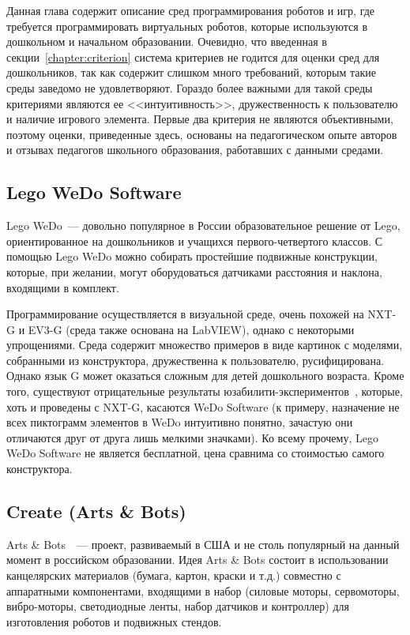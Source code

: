\documentclass[a5paper]{article}
\begin{document}
Данная глава содержит описание сред программирования роботов и игр, где требуется программировать виртуальных роботов, 
которые используются в дошкольном и начальном образовании. Очевидно, что введенная в секции~\ref{chapter:criterion} 
система критериев 
не годится для оценки сред для дошкольников, так как содержит слишком много требований, которым такие среды 
заведомо не удовлетворяют. Гораздо более важными для такой среды критериями являются ее <<интуитивность>>, 
дружественность к пользователю и наличие игрового элемента. Первые два критерия не являются объективными, поэтому оценки, 
приведенные здесь, основаны на педагогическом опыте авторов и отзывах педагогов школьного образования, 
работавших с данными средами.

\subsection{Lego WeDo Software}

Lego WeDo~--- довольно популярное в России образовательное решение от Lego, ориентированное на дошкольников и 
учащихся первого-четвертого классов. С помощью Lego WeDo можно собирать простейшие подвижные конструкции, 
которые, при желании, могут оборудоваться датчиками расстояния и наклона, входящими в комплект.

Программирование осуществляется в визуальной среде, очень похожей на NXT-G и EV3-G (среда также основана 
на LabVIEW), однако с некоторыми упрощениями. Среда содержит множество примеров в виде картинок с моделями, 
собранными из конструктора, дружественна к пользователю, русифицирована. Однако язык G может оказаться 
сложным для детей дошкольного возраста. Кроме того, существуют отрицательные результаты 
юзабилити-экспериментов~\cite{nguyen2011case}, 
которые, хоть и проведены с NXT-G, касаются WeDo Software (к примеру, назначение не всех пиктограмм элементов 
в WeDo интуитивно понятно, зачастую они отличаются друг от друга лишь мелкими значками). Ко всему прочему, 
Lego WeDo Software не является бесплатной, цена сравнима со стоимостью самого конструктора.

\subsection{Create (Arts \& Bots)}

Arts \& Bots~\cite{cross2013visual}~--- проект, развиваемый в США и не столь популярный на данный момент 
в российском образовании. 
Идея Arts \& Bots состоит в использовании канцелярских материалов (бумага, картон, краски и т.д.) совместно 
с аппаратными компонентами, входящими в набор (силовые моторы, сервомоторы, вибро-моторы, светодиодные ленты, 
набор датчиков и контроллер) для изготовления роботов и подвижных стендов. 
\end{document}

